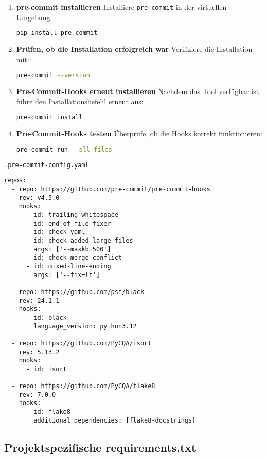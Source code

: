 \documentclass{vorlage-design-main}
\begin{document}
\begin{enumerate}
\def\labelenumi{\arabic{enumi}.}
\item
  \textbf{pre-commit installieren} Installiere
  \verb|pre-commit| in der virtuellen Umgebung:

\begin{lstlisting}[language=bash]
pip install pre-commit
\end{lstlisting}
\item
  \textbf{Prüfen, ob die Installation erfolgreich war} Verifiziere die
  Installation mit:

\begin{lstlisting}[language=bash]
pre-commit --version
\end{lstlisting}
\item
  \textbf{Pre-Commit-Hooks erneut installieren} Nachdem das Tool
  verfügbar ist, führe den Installationsbefehl erneut aus:

\begin{lstlisting}[language=bash]
pre-commit install
\end{lstlisting}
\item
  \textbf{Pre-Commit-Hooks testen} Überprüfe, ob die Hooks korrekt
  funktionieren:

\begin{lstlisting}[language=bash]
pre-commit run --all-files
\end{lstlisting}
\end{enumerate}

\verb|.pre-commit-config.yaml|

\begin{lstlisting}
repos:
  - repo: https://github.com/pre-commit/pre-commit-hooks
    rev: v4.5.0
    hooks:
      - id: trailing-whitespace
      - id: end-of-file-fixer
      - id: check-yaml
      - id: check-added-large-files
        args: ['--maxkb=500']
      - id: check-merge-conflict
      - id: mixed-line-ending
        args: ['--fix=lf']

  - repo: https://github.com/psf/black
    rev: 24.1.1
    hooks:
      - id: black
        language_version: python3.12

  - repo: https://github.com/PyCQA/isort
    rev: 5.13.2
    hooks:
      - id: isort

  - repo: https://github.com/PyCQA/flake8
    rev: 7.0.0
    hooks:
      - id: flake8
        additional_dependencies: [flake8-docstrings]
\end{lstlisting}

\subsection{Projektspezifische
requirements.txt}\label{projektspezifische-requirements.txt}
\end{document}
